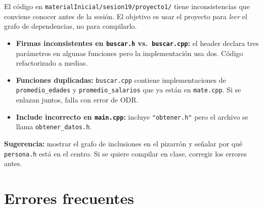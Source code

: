 \documentclass[12pt, oneside]{article}
\begin{document}
\begin{notaprofesor}
  El código en \texttt{materialInicial/sesion19/proyecto1/} tiene inconsistencias
  que conviene conocer antes de la sesión.  El objetivo es usar el proyecto para
  \textit{leer} el grafo de dependencias, no para compilarlo.

  \begin{itemize}
    \item \textbf{Firmas inconsistentes en \texttt{buscar.h} vs.\ \texttt{buscar.cpp}:}
          el header declara tres parámetros en algunas funciones pero la
          implementación usa dos.  Código refactorizado a medias.
    \item \textbf{Funciones duplicadas:} \texttt{buscar.cpp} contiene
          implementaciones de \texttt{promedio\_edades} y
          \texttt{promedio\_salarios} que ya están en \texttt{mate.cpp}.
          Si se enlazan juntos, falla con error de ODR.
    \item \textbf{Include incorrecto en \texttt{main.cpp}:}
          incluye \texttt{"obtener.h"} pero el archivo se llama
          \texttt{obtener\_datos.h}.
  \end{itemize}

  \textbf{Sugerencia:} mostrar el grafo de inclusiones en el pizarrón
  y señalar por qué \texttt{persona.h} está en el centro.  Si se quiere
  compilar en clase, corregir los errores antes.
\end{notaprofesor}

\section{Errores frecuentes}
\end{document}

